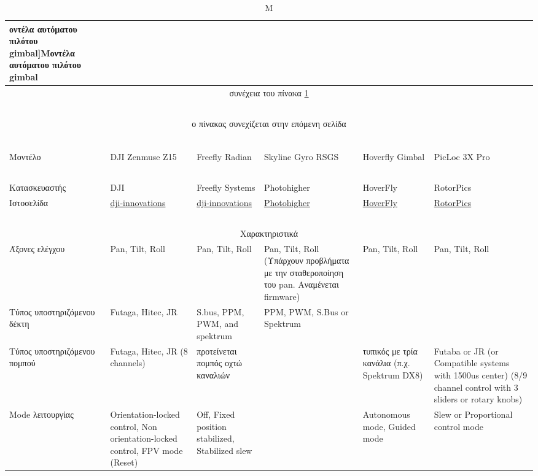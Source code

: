 \documentclass[a4paper, 12pt, twoside]{report}
\begin{document}
{{{{{{\begin{landscape}
			\begin{longtable} { m{3cm} m{3cm} m{3cm} m{3cm} m{3cm} m{3cm} }
					\caption Μοντέλα αυτόματου πιλότου gimbal]{Μοντέλα αυτόματου πιλότου gimbal}
					\label{πιν.:Μοντέλα αυτόματου πιλότου gimbal}\\
					\hline
					\endfirsthead
					\multicolumn{6}{c}{συνέχεια του πίνακα \ref{πιν.:Μοντέλα αυτόματου πιλότου gimbal}}\\
					\hline
					~\\
					\endhead
					\hline
					\multicolumn{6}{c}{ο πίνακας συνεχίζεται στην επόμενη σελίδα}\\
					\endfoot
					\multicolumn{6}{c}{ολοκληρώθηκε ο πίνακας \ref{πιν.:Μοντέλα αυτόματου πιλότου gimbal}}\\
					\endlastfoot
					~\\
					Μοντέλο & DJI Zenmuse Z15 & Freefly Radian & Skyline Gyro RSGS & Hoverfly Gimbal & PicLoc 3X Pro\\
					\hline
					~\\
					Κατασκευαστής & DJI & Freefly Systems & Photohigher & HoverFly & RotorPics\\
					Ιστοσελίδα & \href{http://www.dji-innovations.com/products/zenmuse-z15/overview/}{dji-innovations} & \href{http://www.freeflysystems.com/products/freefly-radian.php}{dji-innovations} & \href{http://photohigher.co.nz/products/flight-and-gimbal-control-systems/skyline-gyro-rsgs/}{Photohigher} & \href{http://www.hoverflytech.com/gimbal_1WNK.html}{HoverFly} & \href{http://www.rotorpics.com/}{RotorPics}\\
					\hline
					~\\
					\multicolumn{6}{c}{Χαρακτηριστικά}\\
					\hdashline
					Άξονες ελέγχου & Pan, Tilt, Roll & Pan, Tilt, Roll & Pan, Tilt, Roll (Υπάρχουν προβλήματα με την σταθεροποίηση του pan. Αναμένεται firmware) & Pan, Tilt, Roll & Pan, Tilt, Roll\\
					\hdashline
					Τύπος υποστηριζόμενου δέκτη & Futaga, Hitec, JR & S.bus, PPM, PWM, and spektrum & PPM, PWM, S.Bus or Spektrum & & \\
					\hdashline
					Τύπος υποστηριζόμενου πομπού & Futaga, Hitec, JR (8 channels) & προτείνεται πομπός οχτώ καναλιών & & τυπικός με τρία κανάλια (π.χ. Spektrum DX8) & Futaba or JR (or Compatible systems with 1500us center) (8/9 channel control with 3 sliders or rotary knobs)\\
					\hdashline
					Mode λειτουργίας & Orientation-locked control, Non orientation-locked control, FPV mode (Reset) & Off, Fixed position stabilized, Stabilized slew & & Autonomous mode, Guided mode & Slew or Proportional control mode\\

\end{longtable}
\end{landscape}}}}}}}
\end{document}
